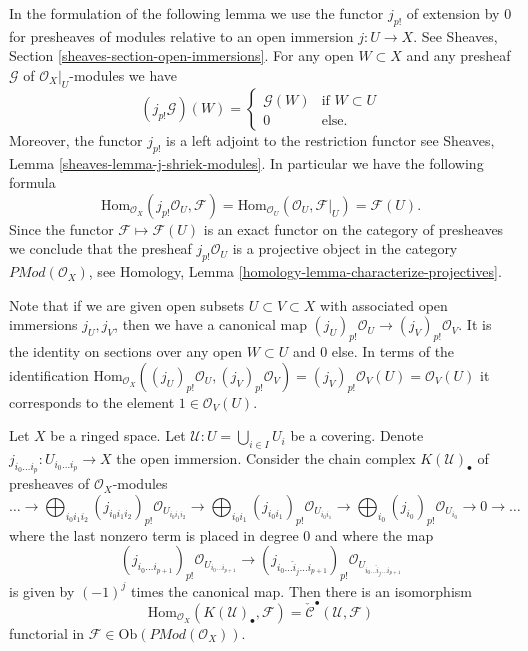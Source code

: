 \noindent
In the formulation of the following lemma we use the functor $j_{p!}$ of
extension by $0$ for presheaves of modules
relative to an open immersion $j : U \to X$.
See Sheaves, Section \ref{sheaves-section-open-immersions}. For any open
$W \subset X$ and any presheaf $\mathcal{G}$ of $\mathcal{O}_X|_U$-modules
we have
$$
(j_{p!}\mathcal{G})(W) = 
\left\{
\begin{matrix}
\mathcal{G}(W) & \text{if } W \subset U \\
0 & \text{else.}
\end{matrix}
\right.
$$
Moreover, the functor $j_{p!}$ is a left adjoint to the restriction functor
see Sheaves, Lemma \ref{sheaves-lemma-j-shriek-modules}.
In particular we have the following formula
$$
\text{Hom}_{\mathcal{O}_X}(j_{p!}\mathcal{O}_U, \mathcal{F})
=
\text{Hom}_{\mathcal{O}_U}(\mathcal{O}_U, \mathcal{F}|_U)
=
\mathcal{F}(U).
$$
Since the functor $\mathcal{F} \mapsto \mathcal{F}(U)$ is an exact functor
on the category of presheaves we conclude that the presheaf
$j_{p!}\mathcal{O}_U$ is a projective object in the category
$\textit{PMod}(\mathcal{O}_X)$, see
Homology, Lemma \ref{homology-lemma-characterize-projectives}.

\medskip\noindent
Note that if we are given open subsets $U \subset V \subset X$
with associated open immersions $j_U, j_V$, then we have a canonical
map $(j_U)_{p!}\mathcal{O}_U \to (j_V)_{p!}\mathcal{O}_V$. It is the
identity on sections over any open $W \subset U$ and $0$ else.
In terms of the identification
$\text{Hom}_{\mathcal{O}_X}((j_U)_{p!}\mathcal{O}_U, (j_V)_{p!}\mathcal{O}_V) =
(j_V)_{p!}\mathcal{O}_V(U) = \mathcal{O}_V(U)$ it corresponds to
the element $1 \in \mathcal{O}_V(U)$.

\begin{lemma}
\label{lemma-cech-map-into}
Let $X$ be a ringed space.
Let $\mathcal{U} : U = \bigcup_{i \in I} U_i$ be a covering.
Denote $j_{i_0\ldots i_p} : U_{i_0 \ldots i_p} \to X$ the open immersion.
Consider the chain complex $K(\mathcal{U})_\bullet$
of presheaves of $\mathcal{O}_X$-modules
$$
\ldots
\to
\bigoplus_{i_0i_1i_2} (j_{i_0i_1i_2})_{p!}\mathcal{O}_{U_{i_0i_1i_2}}
\to
\bigoplus_{i_0i_1} (j_{i_0i_1})_{p!}\mathcal{O}_{U_{i_0i_1}}
\to
\bigoplus_{i_0} (j_{i_0})_{p!}\mathcal{O}_{U_{i_0}}
\to 0 \to \ldots
$$
where the last nonzero term is placed in degree $0$
and where the map
$$
(j_{i_0\ldots i_{p + 1}})_{p!}\mathcal{O}_{U_{i_0\ldots i_{p + 1}}}
\longrightarrow
(j_{i_0\ldots \hat i_j \ldots i_{p + 1}})_{p!}
\mathcal{O}_{U_{i_0\ldots \hat i_j \ldots i_{p + 1}}}
$$
is given by $(-1)^j$ times the canonical map.
Then there is an isomorphism
$$
\text{Hom}_{\mathcal{O}_X}(K(\mathcal{U})_\bullet, \mathcal{F})
=
\check{\mathcal{C}}^\bullet(\mathcal{U}, \mathcal{F})
$$
functorial in $\mathcal{F} \in \text{Ob}(\textit{PMod}(\mathcal{O}_X))$.
\end{lemma}

